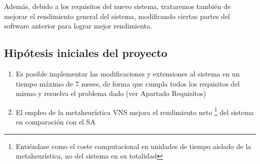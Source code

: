Además, debido a los requisitos del nuevo sistema, trataremos también de mejorar el rendimiento general del sistema, modificando ciertas partes del software anterior para lograr mejor rendimiento.

\subsection{Hipótesis iniciales del proyecto}
\label{sec:Hipotesis}
\begin{enumerate}[label={H\arabic*}]
    \item \label{H1} Es posible implementar las modificaciones y extensiones al sistema en un tiempo máximo de 7 meses, de forma que cumpla todos los requisitos del mismo y resuelva el problema dado (ver Apartado Requisitos) %
    \item \label{H2} El empleo de la metaheurística VNS mejora el rendimiento neto
    \footnote{Entiéndase como el coste computacional en unidades de tiempo aislado de la metaheurística, no del sistema en su totalidad}
    del sistema en comparación con el SA
\end{enumerate}

%
%
\glsaddall
\printglossary[title={Definiciones, acrónimos y abreviaturas}]
%
%
%